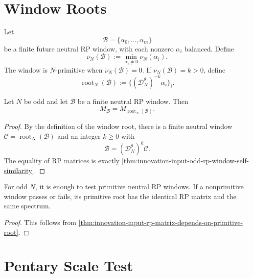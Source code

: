 \section{Window Roots}
\label{sec:innovation-input-window-roots}

\begin{definition}
\label{def:innovation-input-future-neutral-window-root}
Let
$$
\mathcal B=\{\alpha_0,\ldots,\alpha_m\}
$$
be a finite future neutral RP window, with each nonzero $\alpha_i$
balanced. Define
$$
\nu_N(\mathcal B)
:=
\min_{\alpha_i\ne0}\nu_N(\alpha_i).
$$
The window is $N$-primitive when $\nu_N(\mathcal B)=0$. If
$\nu_N(\mathcal B)=k>0$, define
$$
\operatorname{root}_N(\mathcal B)
:=
\{(\mathcal D_N^\theta)^{-k}\alpha_i\}_i.
$$
\end{definition}

\begin{theorem}
\label{thm:innovation-input-rp-matrix-depends-on-primitive-root}
Let $N$ be odd and let $\mathcal B$ be a finite neutral RP window. Then
$$
M_{\mathcal B}
=
M_{\operatorname{root}_N(\mathcal B)}.
$$
\end{theorem}

\begin{proof}
By the definition of the window root, there is a finite neutral window
$\mathcal C=\operatorname{root}_N(\mathcal B)$ and an integer $k\ge0$ with
$$
\mathcal B=(\mathcal D_N^\theta)^k\mathcal C.
$$
The equality of RP matrices is exactly
\autoref{thm:innovation-input-odd-rp-window-self-similarity}.
\end{proof}

\begin{corollary}
\label{cor:innovation-input-primitive-window-pruning}
For odd $N$, it is enough to test primitive neutral RP windows. If a
nonprimitive window passes or fails, its primitive root has the identical
RP matrix and the same spectrum.
\end{corollary}

\begin{proof}
This follows from
\autoref{thm:innovation-input-rp-matrix-depends-on-primitive-root}.
\end{proof}

\section{Pentary Scale Test}
\label{sec:innovation-input-pentary-scale-test}

